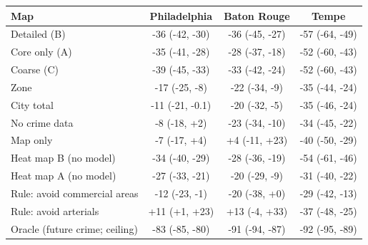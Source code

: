 \begin{tabular}{lccc}
\toprule
Map & Philadelphia & Baton Rouge & Tempe \\
\midrule
Detailed (B) & -36 (-42, -30) & -36 (-45, -27) & -57 (-64, -49) \\
Core only (A) & -35 (-41, -28) & -28 (-37, -18) & -52 (-60, -43) \\
Coarse (C) & -39 (-45, -33) & -33 (-42, -24) & -52 (-60, -43) \\
\midrule
Zone & -17 (-25, -8) & -22 (-34, -9) & -35 (-44, -24) \\
City total & -11 (-21, -0.1) & -20 (-32, -5) & -35 (-46, -24) \\
\midrule
No crime data & -8 (-18, +2) & -23 (-34, -10) & -34 (-45, -22) \\
Map only & -7 (-17, +4) & +4 (-11, +23) & -40 (-50, -29) \\
\midrule
Heat map B (no model) & -34 (-40, -29) & -28 (-36, -19) & -54 (-61, -46) \\
Heat map A (no model) & -27 (-33, -21) & -20 (-29, -9) & -31 (-40, -22) \\
Rule: avoid commercial areas & -12 (-23, -1) & -20 (-38, +0) & -29 (-42, -13) \\
Rule: avoid arterials & +11 (+1, +23) & +13 (-4, +33) & -37 (-48, -25) \\
\midrule
Oracle (future crime; ceiling) & -83 (-85, -80) & -91 (-94, -87) & -92 (-95, -89) \\
\bottomrule
\end{tabular}
